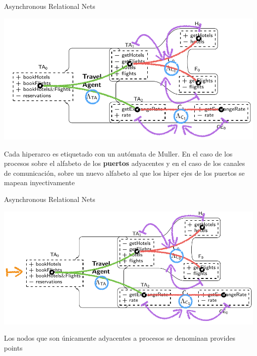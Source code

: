 \documentclass[10pt,xcolor={table,dvipsnames},t]{beamer}
\begin{document}
\begin{frame}{Asynchronous Relational Nets \cite{fiadeiro:fase2011}}
\begin{center}
\includegraphics[scale=0.5]{images/ARN2.png}
\end{center}
Cada hiperarco es etiquetado con un \textcolor{muller}{autómata de Muller}. En el caso de los \textcolor{proc}{procesos} sobre el alfabeto de los \textbf{puertos} adyacentes y en el caso de los \textcolor{com}{canales de comunicación}, sobre un nuevo alfabeto al que los hiper ejes de los puertos se \textcolor{map}{mapean inyectivamente}  
\end{frame}

\begin{frame}{Asynchronous Relational Nets \cite{fiadeiro:fase2011}}
 \vspace{\fill}
\begin{center}
\includegraphics[scale=0.5]{images/ARN3.png}
\end{center}
 \vspace{\fill}
Los nodos que son únicamente adyacentes a \textcolor{proc}{procesos} se denominan \textcolor{prov}{provides points}  
 \vspace{\fill}
\end{frame}
\end{document}

